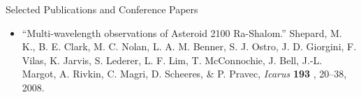 \documentclass[11pt,oneside]{article}
\newenvironment{ressection}[1]{
	\vspace{4pt}
	{\Large#1}
	\begin{itemize}
	\vspace{3pt}
}{
	\end{itemize}
}
\newcommand{\resitem}[1]{
	\vspace{-4pt}
	\item \begin{flushleft} #1 \end{flushleft}
}
\begin{document}
\begin{ressection}{Selected Publications and Conference Papers}







\resitem{ ``Multi-wavelength observations of Asteroid 2100 Ra-Shalom.'' Shepard, M. 
K., B. E. Clark, M. C. Nolan, L. A. M. Benner, S. J. Ostro, J. D. Giorgini, 
F. Vilas, K. Jarvis, S. Lederer, L. F. Lim, T. McConnochie, J. Bell, J.-L. 
Margot, A. Rivkin, C. Magri, D. Scheeres, 
\& P. Pravec,  {\it Icarus} {\bf 193 }, 20--38, 2008.  
}




\end{ressection}
\end{document}
